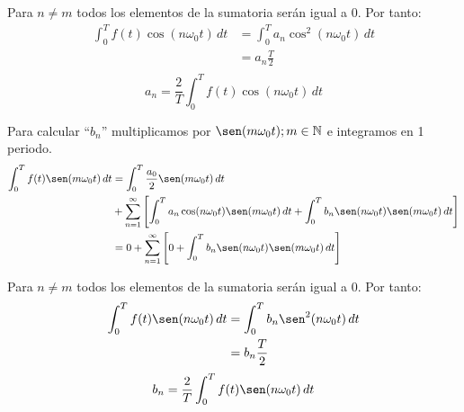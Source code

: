 Para $n\neq m$ todos los elementos de la sumatoria serán igual a $0$.
Por tanto:
\begin{equation*}
\begin{split}
    \int_{0}^{T}f(t)\cos(n\omega_0 t)\,dt
        &=\int_{0}^{T}a_n\cos^2(n\omega_0 t)\,dt\\
        &=a_n \frac{T}{2}\\
\end{split}
\end{equation*}
\begin{equation}
    a_n=\frac{2}{T}\int_{0}^{T}f(t)\cos(n\omega_0 t)\,dt
\end{equation}

Para calcular ``$b_n$'' multiplicamos por $\sen(m\omega_0 t); m\in\mathbb{N}$ e
integramos en 1 periodo.
\begin{equation*}
\begin{split}
    \int_{0}^{T}f(t)\sen(m\omega_0 t)\,dt
        &=\int_{0}^{T}\frac{a_0}{2}\sen(m\omega_0 t)\,dt\\
        &+\sum_{n=1}^{\infty}\left[
          \int_{0}^{T}a_n\cos(n\omega_0 t)\sen(m\omega_0 t)\,dt+
          \int_{0}^{T}b_n\sen(n\omega_0 t)\sen(m\omega_0 t)\,dt\right]\\
        &=0+\sum_{n=1}^{\infty}\left[
          0+\int_{0}^{T}b_n\sen(n\omega_0 t)\sen(m\omega_0 t)\,dt\right]\\
\end{split}
\end{equation*}

Para $n\neq m$ todos los elementos de la sumatoria serán igual a $0$.
Por tanto:
\begin{equation*}
\begin{split}
    \int_{0}^{T}f(t)\sen(n\omega_0 t)\,dt
        &=\int_{0}^{T}b_n\sen^2(n\omega_0 t)\,dt\\
        &=b_n \frac{T}{2}\\
\end{split}
\end{equation*}
\begin{equation}
    b_n=\frac{2}{T}\int_{0}^{T}f(t)\sen(n\omega_0 t)\,dt
\end{equation}

